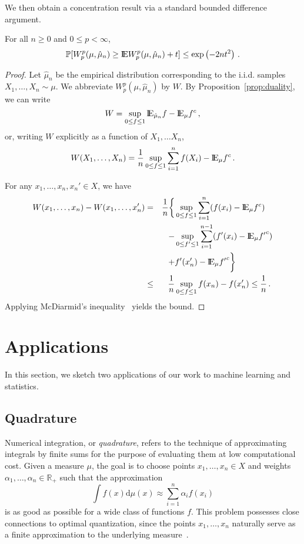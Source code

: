\documentclass[sts]{imsart}
\newcommand{\RR}{\mathbb{R}}
\newcommand{\p}{\mathbb{P}}
\begin{document}
We then obtain a concentration result via a standard bounded difference argument.
\begin{proposition}\label{prop:high_probability}
For all $n \geq 0$ and $0 \leq p < \infty$,
\begin{equation*}
\p[W_p^p(\mu, \hat \mu_n) \geq \E W_p^p(\mu, \hat \mu_n) + t] \leq \exp\left(-2nt^2\right)\,.
\end{equation*}
\end{proposition}
\begin{proof}
Let $\hat \mu_n$ be the empirical distribution corresponding to the i.i.d. samples~$X_1, \dots, X_n \sim \mu$.
We abbreviate $W_p^p(\mu, \hat \mu_n)$ by $W$.
By Proposition~\ref{prop:duality}, we can write
\begin{equation*}
W = \sup_{0 \leq f \leq 1} {\rm I}\kern-0.18em{\rm E}_{\hat \mu_n} f - {\rm I}\kern-0.18em{\rm E}_\mu f^c\,,
\end{equation*}
or, writing $W$ explicitly as a function of $X_1, \dots X_n$,
\begin{equation*}
W(X_1, \dots, X_n) = \frac 1 n \sup_{0 \leq f \leq 1}  \sum_{i=1}^n f(X_i) - {\rm I}\kern-0.18em{\rm E}_\mu f^c\,.
\end{equation*}

For any $x_1, \dots, x_n, x_n' \in X$, we have
\begin{alignat*}{2}
W(x_1, \dots, x_n) - W(x_1, \dots, x'_n) & = &\frac 1 n \bigg\{&\sup_{0 \leq f \leq 1}  \sum_{i=1}^{n} (f(x_i) - {\rm I}\kern-0.18em{\rm E}_\mu f^c) \\
&&-&\sup_{0 \leq f'\leq 1 } \sum_{i=1}^{n-1} (f'(x_i) -  {\rm I}\kern-0.18em{\rm E}_\mu {f'}^c) \\
&&+& f'(x_n')- {\rm I}\kern-0.18em{\rm E}_\mu {f'}^c\bigg\} \\
& \leq &\frac 1 n &\sup_{0 \leq f \leq 1} f(x_n) - f(x_n') \leq \frac 1 n\,.
\end{alignat*}
Applying McDiarmid's inequality~\cite{McD89} yields the bound.
\end{proof}

\section{Applications}
In this section, we sketch two applications of our work to machine learning and statistics.

\subsection{Quadrature}\label{sec:quadrature}
Numerical integration, or \emph{quadrature}, refers to the technique of approximating integrals by finite sums for the purpose of evaluating them at low computational cost.
Given a measure $\mu$, the goal is to choose points $x_1, \dots, x_n \in X$ and weights $\alpha_1, \dots, \alpha_n \in \RR_+$ such that the approximation
\begin{equation*}
\int f(x) \mathrm{d}\mu(x) \approx \sum_{i=1}^n \alpha_i f(x_i)
\end{equation*}
is as good as possible for a wide class of functions $f$.
This problem possesses close connections to optimal quantization, since the points $x_1, \dots, x_n$ naturally serve as a finite approximation to the underlying measure~\cite{GraLus07,Pag98}.
\end{document}
